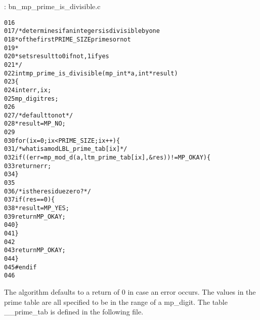 \documentclass[b5paper]{book}
\begin{document}
\vspace{+3mm}\begin{small}
\hspace{-5.1mm}{\bf File}: bn\_mp\_prime\_is\_divisible.c
\vspace{-3mm}
\begin{alltt}
016   
017   /* determines if an integers is divisible by one 
018    * of the first PRIME_SIZE primes or not
019    *
020    * sets result to 0 if not, 1 if yes
021    */
022   int mp_prime_is_divisible (mp_int * a, int *result)
023   \{
024     int     err, ix;
025     mp_digit res;
026   
027     /* default to not */
028     *result = MP_NO;
029   
030     for (ix = 0; ix < PRIME_SIZE; ix++) \{
031       /* what is a mod LBL_prime_tab[ix] */
032       if ((err = mp_mod_d (a, ltm_prime_tab[ix], &res)) != MP_OKAY) \{
033         return err;
034       \}
035   
036       /* is the residue zero? */
037       if (res == 0) \{
038         *result = MP_YES;
039         return MP_OKAY;
040       \}
041     \}
042   
043     return MP_OKAY;
044   \}
045   #endif
046   
\end{alltt}
\end{small}

The algorithm defaults to a return of $0$ in case an error occurs.  The values in the prime table are all specified to be in the range of a 
mp\_digit.  The table \_\_prime\_tab is defined in the following file.
\end{document}
